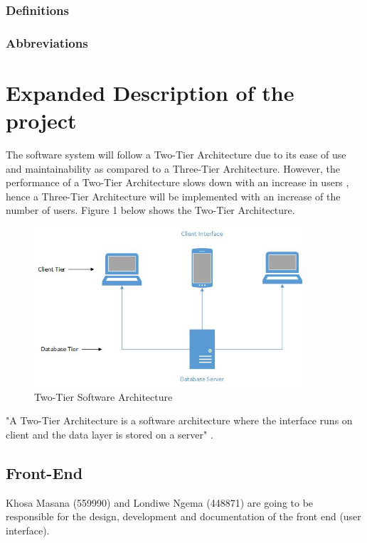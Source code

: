 \documentclass[10pt,onecolumn]{RequimentsGathering}
\begin{document}
\subsubsection{Definitions}

\subsubsection{Abbreviations}
%
\section{Expanded Description of the project}

The software system will follow a Two-Tier Architecture due to its ease of use and maintainability as compared to a Three-Tier Architecture. However, the performance of a Two-Tier Architecture slows down with an increase in users \cite{ref3}, hence a Three-Tier Architecture will be implemented with an increase of the number of users. Figure 1 below shows the Two-Tier Architecture.   
\begin{center}
\begin{figure}[h]
\centering
\includegraphics[width=10cm]{Two-Tier}
\caption{Two-Tier Software Architecture}
\end{figure}
\end{center}


"A Two-Tier Architecture is a software architecture where the interface runs on client and the data layer is stored on a server" \cite{ref4}.
\subsection{Front-End}

Khosa Masana (559990) and Londiwe Ngema (448871) are going to be responsible for the design, development and documentation of the front end (user interface).
\end{document}
